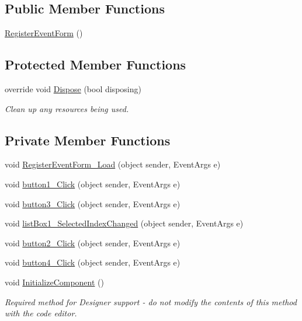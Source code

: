 \subsection*{Public Member Functions}
\begin{DoxyCompactItemize}
\item 
\hyperlink{classPCO_1_1__0_1_1RegisterEventForm_ad07130f7efb6992bcbf2985aa47c03f7}{Register\+Event\+Form} ()
\end{DoxyCompactItemize}
\subsection*{Protected Member Functions}
\begin{DoxyCompactItemize}
\item 
override void \hyperlink{classPCO_1_1__0_1_1RegisterEventForm_a0ae9bae95772a971a0a1965e912d1570}{Dispose} (bool disposing)
\begin{DoxyCompactList}\small\item\em Clean up any resources being used. \end{DoxyCompactList}\end{DoxyCompactItemize}
\subsection*{Private Member Functions}
\begin{DoxyCompactItemize}
\item 
void \hyperlink{classPCO_1_1__0_1_1RegisterEventForm_aae3e83a77c3537a8adb5b44bce257941}{Register\+Event\+Form\+\_\+\+Load} (object sender, Event\+Args e)
\item 
void \hyperlink{classPCO_1_1__0_1_1RegisterEventForm_a70763d4e3b7bff428a1465a3a71be63e}{button1\+\_\+\+Click} (object sender, Event\+Args e)
\item 
void \hyperlink{classPCO_1_1__0_1_1RegisterEventForm_a9d96ca1066a03fde9504b3b526bec3c9}{button3\+\_\+\+Click} (object sender, Event\+Args e)
\item 
void \hyperlink{classPCO_1_1__0_1_1RegisterEventForm_a1f2a9979dc0f8c7268fc03f9886c7a2a}{list\+Box1\+\_\+\+Selected\+Index\+Changed} (object sender, Event\+Args e)
\item 
void \hyperlink{classPCO_1_1__0_1_1RegisterEventForm_abbd7cfbf7df74e7c257c370eff4bd3f8}{button2\+\_\+\+Click} (object sender, Event\+Args e)
\item 
void \hyperlink{classPCO_1_1__0_1_1RegisterEventForm_acbfb155a6a0a01796531fee016790c9a}{button4\+\_\+\+Click} (object sender, Event\+Args e)
\item 
void \hyperlink{classPCO_1_1__0_1_1RegisterEventForm_a86205dc5856bd764865a4ee455f0aae9}{Initialize\+Component} ()
\begin{DoxyCompactList}\small\item\em Required method for Designer support -\/ do not modify the contents of this method with the code editor. \end{DoxyCompactList}\end{DoxyCompactItemize}

